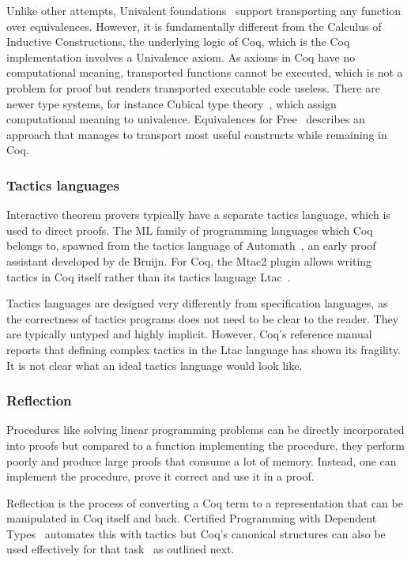 \documentclass[english, 12pt, a4paper, sci, a-1b, online]{aaltothesis}
\begin{document}
Unlike other attempts, Univalent foundations~\cite{hottbook} support transporting any function over equivalences. However, it is fundamentally different from the Calculus of Inductive Constructions, the underlying logic of Coq, which is the Coq implementation involves a Univalence axiom. As axioms in Coq have no computational meaning, transported functions cannot be executed, which is not a problem for proof but renders transported executable code useless. There are newer type systems, for instance Cubical type theory~\cite{cubicalTT}, which assign computational meaning to univalence. Equivalences for Free~\cite{equivalencesFF} describes an approach that manages to transport most useful constructs while remaining in Coq.

\subsubsection{Tactics languages}

Interactive theorem provers typically have a separate tactics language, which is used to direct proofs. The ML family of programming languages which Coq belongs to, spawned from the tactics language of Automath~\cite{automath}, an early proof assistant developed by de Bruijn. For Coq, the Mtac2 plugin allows writing tactics in Coq itself rather than its tactics language Ltac~\cite{coqRefman}.

Tactics languages are designed very differently from specification languages, as the correctness of tactics programs does not need to be clear to the reader. They are typically untyped and highly implicit. However, Coq's reference manual~\cite{coqRefman} reports that defining complex tactics in the Ltac language has shown its fragility. It is not clear what an ideal tactics language would look like.

\subsubsection{Reflection}

Procedures like solving linear programming problems can be directly incorporated into proofs but compared to a function implementing the procedure, they perform poorly and produce large proofs that consume a lot of memory. Instead, one can implement the procedure, prove it correct and use it in a proof.~\cite{CPDT}

Reflection is the process of converting a Coq term to a representation that can be manipulated in Coq itself and back. Certified Programming with Dependent Types~\cite{CPDT} automates this with tactics but Coq's canonical structures can also be used effectively for that task~\cite{overloadingCanonical} as outlined next.
\end{document}
